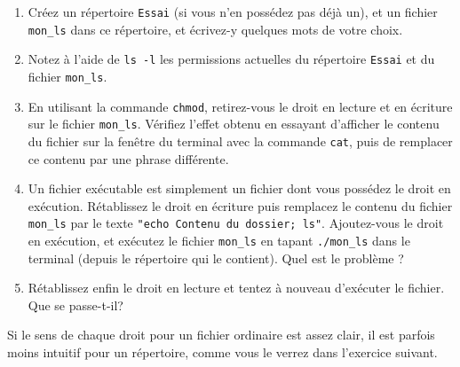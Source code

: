 \documentclass{article}
\begin{document}
\begin{exercice}

\begin{enumerate}
\def\labelenumi{\arabic{enumi}.}
\item
  Créez un répertoire \texttt{Essai} (si vous n'en possédez pas déjà
  un), et un fichier \texttt{mon\_ls} dans ce répertoire, et écrivez-y
  quelques mots de votre choix.
\item
  Notez à l'aide de \texttt{ls\ -l} les permissions actuelles du
  répertoire \texttt{Essai} et du fichier \texttt{mon\_ls}.
\item
  En utilisant la commande \texttt{chmod}, retirez-vous le droit en
  lecture et en écriture sur le fichier \texttt{mon\_ls}. Vérifiez
  l'effet obtenu en essayant d'afficher le contenu du fichier sur la
  fenêtre du terminal avec la commande \texttt{cat}, puis de remplacer
  ce contenu par une phrase différente.
\item
  Un fichier exécutable est simplement un fichier dont vous possédez le
  droit en exécution. Rétablissez le droit en écriture puis remplacez le
  contenu du fichier \texttt{mon\_ls} par le texte
  \texttt{"echo\ Contenu\ du\ dossier;\ ls"}. Ajoutez-vous le droit en
  exécution, et exécutez le fichier \texttt{mon\_ls} en tapant
  \texttt{./mon\_ls} dans le terminal (depuis le répertoire qui le
  contient). Quel est le problème ?
\item
  Rétablissez enfin le droit en lecture et tentez à nouveau d'exécuter
  le fichier. Que se passe-t-il?
\end{enumerate}

\end{exercice}

Si le sens de chaque droit pour un fichier ordinaire est assez clair, il
est parfois moins intuitif pour un répertoire, comme vous le verrez dans
l'exercice suivant.
\end{document}
